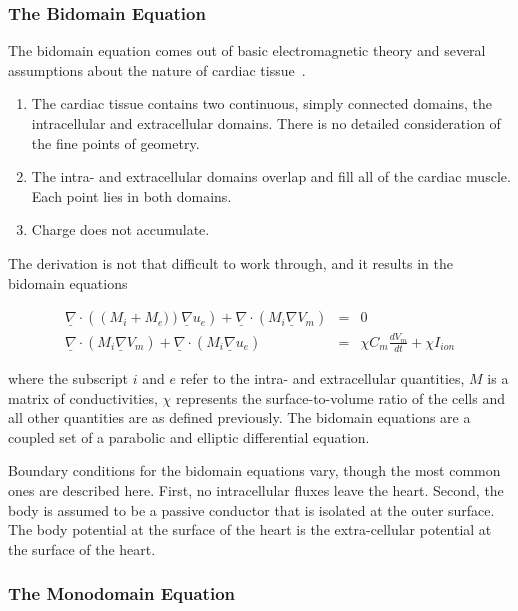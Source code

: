 \subsubsection{The Bidomain Equation}

The bidomain equation comes out of basic electromagnetic theory and several
assumptions about the nature of cardiac tissue~\cite{Tung1978,Geselowitz1983}.
\begin{enumerate}
    \item The cardiac tissue contains two continuous, simply connected domains, the intracellular and extracellular domains.
    There is no detailed consideration of the fine points of geometry.
    \item The intra- and extracellular domains overlap and fill all of the cardiac muscle. Each point lies in both domains.
    \item Charge does not accumulate.
\end{enumerate}

The derivation is not that difficult to work through, and it results in the bidomain equations
\begin{subequation}
\label{eqn:intro:math:bidom}
\begin{align}
\underline{\nabla}\cdot\left(\left(M_{i}+M_{e})\right)\underline{\nabla}u_{e}\right) + \underline{\nabla}\cdot\left( M_{i}\underline{\nabla}V_{m}\right) &=& 0
\label{eqn:intro:math:bidom1}\\
\underline{\nabla}\cdot\left(M_{i}\underline{\nabla}V_{m}\right) + \underline{\nabla}\cdot\left(M_{i}\underline{\nabla}u_{e}\right) &=& \chi C_{m}\frac{dV_{m}}{dt} + \chi{I_{ion}}
\label{eqn:intro:math:bidom2}
\end{align}
\end{subequation}
where the subscript $i$ and $e$ refer to the intra- and extracellular quantities, $M$ is a matrix of conductivities, $\chi$ represents the surface-to-volume ratio of the cells and all other quantities are as defined previously.
The bidomain equations are a coupled set of a parabolic and elliptic differential equation.

Boundary conditions for the bidomain equations vary, though the most common ones are described here.
First, no intracellular fluxes leave the heart.
Second, the body is assumed to be a passive conductor that is isolated at the outer surface.
The body potential at the surface of the heart is the extra-cellular potential at the surface of the heart.

\subsubsection{The Monodomain Equation}

